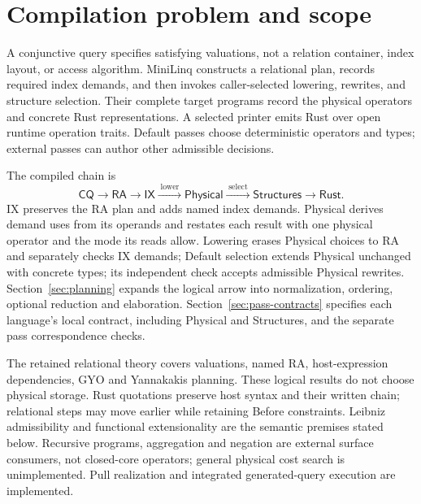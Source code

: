 \section{Compilation problem and scope}
\label{sec:introduction}
A conjunctive query specifies satisfying valuations, not a relation container,
index layout, or access algorithm. MiniLinq constructs a relational plan,
records required index demands, and then invokes caller-selected lowering,
rewrites, and structure selection. Their complete target programs record the
physical operators and concrete Rust representations. A selected printer emits
Rust over open runtime operation traits. Default passes choose deterministic
operators and types; external passes can author other admissible decisions.

The compiled chain is
\[
 \mathsf{CQ}\longrightarrow\mathsf{RA}\longrightarrow\mathsf{IX}
 \xrightarrow{\;\text{lower}\;}\mathsf{Physical}
 \xrightarrow{\;\text{select}\;}\mathsf{Structures}
 \longrightarrow\mathsf{Rust}.
\]
IX preserves the RA plan and adds named index demands.
Physical derives demand uses from its operands and restates each result with one
physical operator and the mode its reads allow. Lowering erases Physical choices
to RA and separately checks IX demands; Default selection extends Physical unchanged with concrete types; its
independent check accepts admissible Physical rewrites. Section~\ref{sec:planning} expands the logical
arrow into normalization, ordering, optional reduction and elaboration.
Section~\ref{sec:pass-contracts} specifies each language's local contract,
including Physical and Structures, and the separate pass correspondence checks.

The retained relational theory covers valuations, named RA, host-expression
dependencies, GYO and Yannakakis planning. These logical results do not choose
physical storage. Rust quotations preserve host syntax and their written chain;
relational steps may move earlier while retaining Before constraints. Leibniz
admissibility and functional extensionality are the semantic premises stated
below. Recursive programs, aggregation and negation are external surface consumers,
not closed-core operators; general physical cost search is unimplemented. Pull realization
and integrated generated-query execution are implemented.
